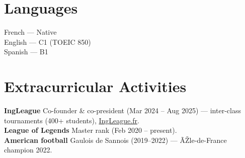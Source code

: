 \documentclass[9pt,a4paper]{article}
\begin{document}
\section{Languages}
 \begin{itemize}[leftmargin=0.15in, label={}]
    \small{\item{
     French --- Native \\
     English --- C1 (TOEIC 850) \\
     Spanish --- B1
    }}
 \end{itemize}

\section{Extracurricular Activities}
 \begin{itemize}[leftmargin=0.15in, label={}]
    \small{\item{
     \textbf{IngLeague} Co-founder \& co-president (Mar 2024 -- Aug 2025) --- inter-class tournaments (400+ students), \href{https://ingleague.fr}{IngLeague.fr}. \\
     \textbf{League of Legends} Master rank (Feb 2020 -- present). \\
     \textbf{American football} Gaulois de Sannois (2019--2022) --- ÃŽle-de-France champion 2022.
    }}
 \end{itemize}
\end{document}
